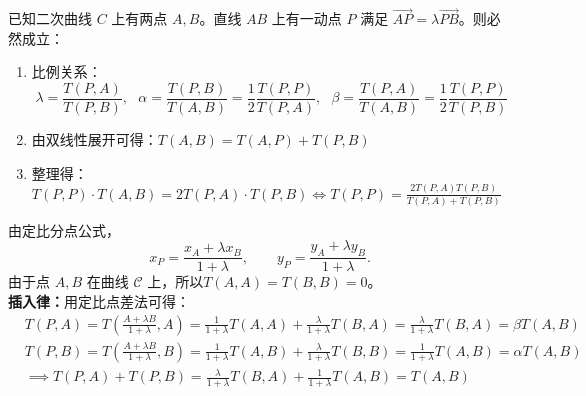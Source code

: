 \begin{conclusion}[定比公式及其推论]
已知二次曲线 $C$ 上有两点 $A, B$。直线 $AB$ 上有一动点 $P$ 满足 $\overrightarrow{AP} = \lambda \overrightarrow{PB}$。则必然成立：
\begin{enumerate}
    \item 比例关系：
    \[\lambda = \frac{T(P,A)}{T(P,B)},~~~\alpha=\frac{T(P,B)}{T(A,B)}=\frac12\frac{T(P,P)}{T(P,A)},~~~\beta=\frac{T(P,A)}{T(A,B)}=\frac12\frac{T(P,P)}{T(P,B)}\]
    \item 由双线性展开可得：$T(A,B) = T(A,P) + T(P,B)$
    \item 整理得：$T(P,P) \cdot T(A,B) = 2 T(P,A) \cdot T(P,B)\Longleftrightarrow T(P,P) = \frac{2 T(P,A) T(P,B)}{T(P,A) + T(P,B)}$
\end{enumerate}
\end{conclusion}
由定比分点公式，
\[
x_P = \frac{x_A+\lambda x_B}{1+\lambda},\qquad y_P=\frac{y_A+\lambda y_B}{1+\lambda}.
\]
由于点 $A, B$ 在曲线 $\mathcal{C}$ 上，所以$T(A,A) = T(B,B) = 0$。\\
\textbf{插入律：}用定比点差法可得：
\begin{align*}
&T(P,A) = T(\frac{A+\lambda B}{1+\lambda},A)=\frac{1}{1+\lambda} T(A,A) +\frac{\lambda}{1+\lambda} T(B,A)=\frac{\lambda}{1+\lambda} T(B,A)=\beta T(A,B)\\
&T(P,B) =T(\frac{A+\lambda B}{1+\lambda},B)=\frac{1}{1+\lambda} T(A,B) +\frac{\lambda}{1+\lambda} T(B,B)=\frac{1}{1+\lambda} T(A,B)=\alpha T(A,B)\\
&\implies T(P,A)+T(P,B)=\frac{\lambda}{1+\lambda} T(B,A)+\frac{1}{1+\lambda} T(A,B)= T(A,B)
\end{align*}

